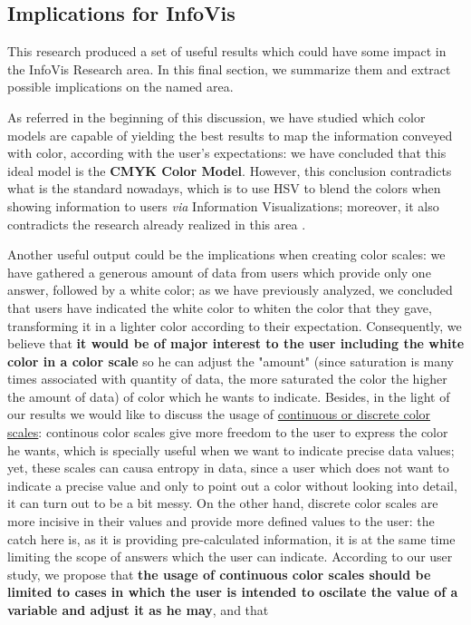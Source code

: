 \subsection{Implications for InfoVis}
\label{subsec:results_discussion_infovis}
%
This research produced a set of useful results which could have some impact in the \gls{InfoVis} Research area. In this final section, we summarize them and extract possible implications on the named area. \par
%
As referred in the beginning of this discussion, we have studied which color models are capable of yielding the best results to map the information conveyed with color, according with the user's expectations: we have concluded that this ideal model is the \textbf{CMYK
Color Model}. However, this conclusion contradicts what is the standard nowadays, which is to use HSV to blend the colors when showing information to users \emph{via} Information Visualizations; moreover, it also contradicts the research already realized in this area
\cite{Gama20141}. \par
%
Another useful output could be the implications when creating color scales: we have gathered a generous amount of data from users which provide only one answer, followed by a white color; as we have previously analyzed, we concluded that users have indicated the white color
to whiten the color that they gave, transforming it in a lighter color according to their expectation. Consequently, we believe that \textbf{it would be of major interest to the user including the white color in a color scale} so he can adjust the "amount" (since saturation
is many times associated with quantity of data, the more saturated the color the higher the amount of data) of color which he wants to indicate. Besides, in the light of our results we would like to discuss the usage of \ul{continuous or discrete color scales}: continous color
scales give more freedom to the user to express the color he wants, which is specially useful when we want to indicate precise data values; yet, these scales can causa entropy in data, since a user which does not want to indicate a precise value and only to point out a
color without looking into detail, it can turn out to be a bit messy. On the other hand, discrete color scales are more incisive in their values and provide more defined values to the user: the catch here is, as it is providing pre-calculated information, it is at the same time
limiting the scope of answers which the user can indicate. According to our user study, we propose that \textbf{the usage of continuous color scales should be limited to cases in which the user is intended to oscilate the value of a variable and adjust it as he may}, and that
